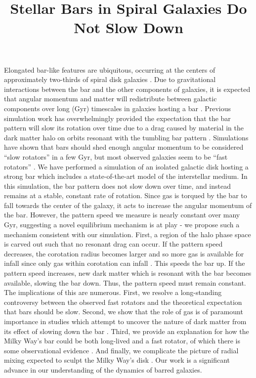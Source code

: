 \documentclass[sn-mathphys]{sn-jnl}%
\theoremstyle{thmstyleone}%
\theoremstyle{thmstyletwo}%
\theoremstyle{thmstylethree}%
\begin{document}
\title{Stellar Bars in Spiral Galaxies Do Not Slow Down}

\maketitle
Elongated bar-like features are ubiquitous, occurring at the centers of
approximately two-thirds of spiral disk galaxies \cite{2000AJ....119..536E,
2007ApJ...657..790M}. Due to gravitational interactions between the bar and
the other components of galaxies, it is expected that angular momentum and
matter will redistribute between galactic components over long (Gyr)
timescales in galaxies hosting a bar \cite{1972MNRAS.157....1L,
1984MNRAS.209..729T, 1985MNRAS.213..451W}. Previous simulation work has
overwhelmingly provided the expectation that the bar pattern will slow its
rotation over time due to a drag caused by material in the dark matter halo on
orbits resonant with the tumbling bar pattern
\cite[e.g.][]{1992ApJ...400...80H, 2000ApJ...543..704D, 2002MNRAS.330...35A,
2002ApJ...569L..83A, 2003MNRAS.341.1179A, 2003MNRAS.346..251O,
2005MNRAS.363..991H, 2006ApJ...637..214M, 2007MNRAS.375..460W,
2009ApJ...697..293D}. Simulations have shown that bars should shed enough
angular momentum to be considered ``slow rotators'' in a few Gyr, but most
observed galaxies seem to be ``fast rotators'' \cite{2011MSAIS..18...23C,
2015AA...576A.102A, 2019MNRAS.482.1733G}. We have performed a simulation of an
isolated galactic disk hosting a strong bar which includes a state-of-the-art
model of the interstellar medium. In this simulation, the bar pattern does not
slow down over time, and instead remains at a stable, constant rate of
rotation. Since gas is torqued by the bar to fall towards the center of the
galaxy, it acts to increase the angular momentum of the bar. However, the
pattern speed we measure is nearly constant over many Gyr, suggesting a novel
equilibrium mechanism is at play - we propose such a mechanism consistent with
our simulation. First, a region of the halo phase space is carved out such
that no resonant drag can occur. If the pattern speed decreases, the
corotation radius becomes larger and so more gas is available for infall since
only gas within corotation can infall \cite[e.g.][]{2011MNRAS.415.1027H}. This
speeds the bar up. If the pattern speed increases, new dark matter which is
resonant with the bar becomes available, slowing the bar down. Thus, the
pattern speed must remain constant. The implications of this are numerous.
First, we resolve a long-standing controversy between the observed fast
rotators and the theoretical expectation that bars should be slow. Second, we
show that the role of gas is of paramount importance in studies which attempt
to uncover the nature of dark matter from its effect of slowing down the bar
\cite{2021MNRAS.500.4710C, 2021MNRAS.505.2412C}. Third, we provide an
explanation for how the Milky Way's bar could be both long-lived and a fast
rotator, of which there is some observational evidence
\cite[e.g.][]{2019MNRAS.490.4740B}. And finally, we complicate the picture of
radial mixing expected to sculpt the Milky Way's disk
\cite[e.g.][]{2012MNRAS.420..913B, 2015ApJ...808..132H}. Our work is a
significant advance in our understanding of the dynamics of barred galaxies.

\backmatter




\end{document}
